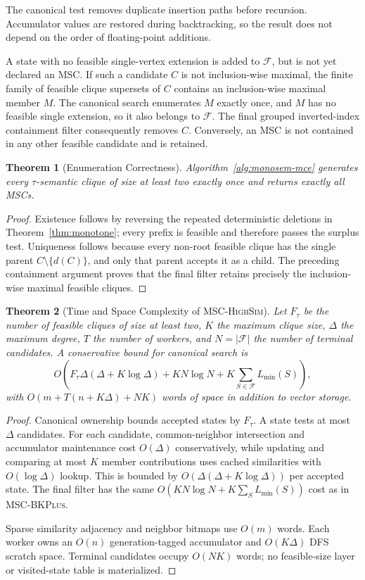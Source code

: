 \documentclass[sigconf, nonacm]{acmart}
\newtheorem{theorem}{Theorem}[section]
\newcommand{\stitle}[1]{\vspace{0.7ex} \noindent{\bf #1}}
\newcommand{\subEnum}{MSC-\textsc{BKPlus}}
\newcommand{\monoSemMCE}{MSC-\textsc{HighSim}}
\begin{document}
The canonical test removes duplicate insertion paths before recursion.
Accumulator values are restored during backtracking, so the result does not
depend on the order of floating-point additions.

\stitle{Inclusion-Wise Maximality.}
A state with no feasible single-vertex extension is added to
$\mathcal{F}$, but is not yet declared an MSC.  If such a candidate
$C$ is not inclusion-wise maximal, the finite family of feasible clique
supersets of $C$ contains an inclusion-wise maximal member $M$.  The
canonical search enumerates $M$ exactly once, and $M$ has no feasible
single extension, so it also belongs to $\mathcal{F}$.  The final
  grouped inverted-index containment filter consequently removes $C$.  Conversely,
an MSC is not contained in any other feasible candidate and is retained.

\begin{theorem}[Enumeration Correctness]
\label{thm:monosem-correctness}
Algorithm~\ref{alg:monosem-mce} generates every $\tau$-semantic clique
of size at least two exactly once and returns exactly all MSCs.
\end{theorem}
\begin{proof}
Existence follows by reversing the repeated deterministic deletions in
Theorem~\ref{thm:monotone}; every prefix is feasible and therefore passes
the surplus test.  Uniqueness follows because every non-root feasible
clique has the single parent $C\setminus\{d(C)\}$, and only that parent
accepts it as a child.  The preceding containment argument proves that
the final filter retains precisely the inclusion-wise maximal feasible
cliques.
\end{proof}


\stitle{Complexity.}
\begin{theorem}[Time and Space Complexity of \monoSemMCE]
  \label{thm:monosem-complexity}
  Let $F_\tau$ be the number of feasible cliques of size at least two, $K$ the
  maximum clique size, $\Delta$ the maximum degree, $T$ the number of workers,
  and $N=|\mathcal F|$ the number of terminal candidates.  A conservative
  bound for canonical search is
  \[
    O\!\left(F_\tau\Delta(\Delta+K\log\Delta)
      +KN\log N+K\sum_{S\in\mathcal F}L_{\min}(S)\right),
  \]
  with $O(m+T(n+K\Delta)+NK)$ words of space in addition to vector storage.
\end{theorem}
\begin{proof}
  Canonical ownership bounds accepted states by $F_\tau$.  A state tests at
  most $\Delta$ candidates.  For each candidate, common-neighbor intersection
  and accumulator maintenance cost $O(\Delta)$ conservatively, while updating
  and comparing at most $K$ member contributions uses cached similarities with
  $O(\log\Delta)$ lookup.  This is bounded by
  $O(\Delta(\Delta+K\log\Delta))$ per accepted state. The final filter has the
  same $O(KN\log N+K\sum_S L_{\min}(S))$ cost as in \subEnum.

  Sparse similarity adjacency and neighbor bitmaps use $O(m)$ words.  Each
  worker owns an $O(n)$ generation-tagged accumulator and $O(K\Delta)$ DFS
  scratch space.  Terminal candidates occupy $O(NK)$ words; no feasible-size
  layer or visited-state table is materialized.
\end{proof}
\end{document}
